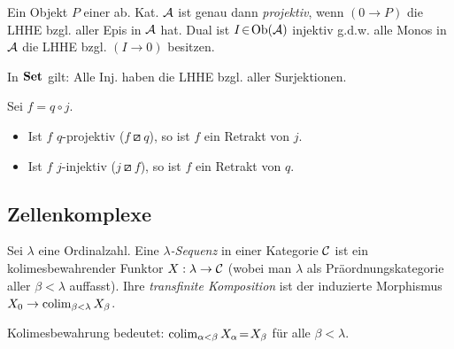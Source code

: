 \documentclass{cheat-sheet}
\newcommand{\lhhe}{\boxslash} %
\begin{document}
\begin{samepage}
\begin{bsp}
  Ein Objekt $P$ einer ab. Kat. $\mathcal{A}$ ist genau dann \emph{projektiv}, wenn $(0 \to P)$ die LHHE bzgl. aller Epis in $\mathcal{A}$ hat.
  Dual ist $I \!\in\! \operatorname{Ob}(\mathcal{A})$ injektiv g.d.w. alle Monos in $\mathcal{A}$ die LHHE bzgl. $(I \to 0)$ besitzen.
\end{bsp}

\begin{bsp}
  In $\mathbf{Set}$ gilt: Alle Inj. haben die LHHE bzgl. aller Surjektionen.
\end{bsp}

\begin{lem}\mbox{}
  Sei $f \!=\! q \circ j$.
  \begin{itemize}
    \item Ist $f$ $q$-projektiv ($f \lhhe q$), so ist $f$ ein Retrakt von $j$.
    \item Ist $f$ $j$-injektiv ($j \lhhe f$), so ist $f$ ein Retrakt von $q$.
  \end{itemize}
\end{lem}

\subsection{Zellenkomplexe}

\end{samepage}

\begin{defn}
  Sei $\lambda$ eine Ordinalzahl. Eine \emph{$\lambda$-Sequenz} in einer Kategorie $\mathcal{C}$ ist ein kolimesbewahrender Funktor $X : \lambda \to \mathcal{C}$ (wobei man $\lambda$ als Präordnungskategorie aller $\beta < \lambda$ auffasst).
  Ihre \emph{transfinite Komposition} ist der induzierte Morphismus $X_0 \to \operatorname{colim}_{\beta < \lambda} X_\beta$.
\end{defn}

\begin{bem}
  Kolimesbewahrung bedeutet: $\operatorname{colim}_{\alpha < \beta} X_\alpha \!=\! X_\beta$ für alle $\beta \!<\! \lambda$.
\end{bem}


\end{document}

